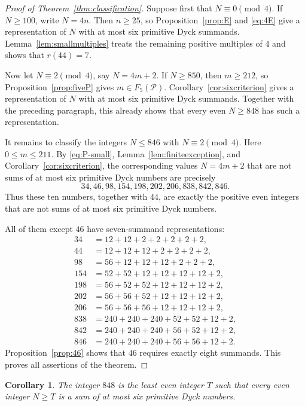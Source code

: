 \documentclass[11pt]{article}
\theoremstyle{plain}
\newtheorem{corollary}[theorem]{Corollary}
\theoremstyle{definition}
\newcommand{\Pset}{\mathcal P}
\begin{document}
\begin{proof}[Proof of Theorem~\ref{thm:classification}]
Suppose first that $N\equiv0\pmod4$.  If $N\geq100$, write $N=4n$.
Then $n\geq25$, so Proposition~\ref{prop:E} and \eqref{eq:4E} give a
representation of $N$ with at most six primitive Dyck summands.
Lemma~\ref{lem:smallmultiples} treats the remaining positive multiples
of $4$ and shows that $r(44)=7$.

Now let $N\equiv2\pmod4$, say $N=4m+2$.  If $N\geq850$, then
$m\geq212$, so Proposition~\ref{prop:fiveP} gives
$m\in F_5(\Pset)$.  Corollary~\ref{cor:sixcriterion} gives a
representation of $N$ with at most six primitive Dyck summands.  Together
with the preceding paragraph, this already shows that every even
$N\geq848$ has such a representation.

It remains to classify the integers $N\leq846$ with
$N\equiv2\pmod4$.  Here $0\leq m\leq211$.  By
\eqref{eq:P-small}, Lemma~\ref{lem:finiteexception}, and
Corollary~\ref{cor:sixcriterion}, the corresponding values $N=4m+2$
that are not sums of at most six primitive Dyck numbers are precisely
\[
 34,46,98,154,198,202,206,838,842,846.
\]
Thus these ten numbers, together with $44$, are exactly the positive even
integers that are not sums of at most six primitive Dyck numbers.

All of them except $46$ have seven-summand representations:
\[
\begin{aligned}
34&=12+12+2+2+2+2+2,\\
44&=12+12+12+2+2+2+2,\\
98&=56+12+12+12+2+2+2,\\
154&=52+52+12+12+12+12+2,\\
198&=56+52+52+12+12+12+2,\\
202&=56+56+52+12+12+12+2,\\
206&=56+56+56+12+12+12+2,\\
838&=240+240+240+52+52+12+2,\\
842&=240+240+240+56+52+12+2,\\
846&=240+240+240+56+56+12+2.
\end{aligned}
\]
Proposition~\ref{prop:46} shows that $46$ requires exactly eight
summands.  This proves all assertions of the theorem.
\end{proof}

\begin{corollary}\label{cor:threshold}
The integer $848$ is the least even integer $T$ such that every even
integer $N\geq T$ is a sum of at most six primitive Dyck numbers.
\end{corollary}
\end{document}
